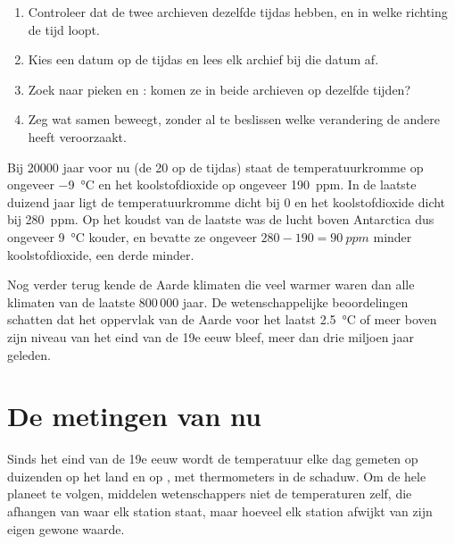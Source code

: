 \begin{method}
\begin{enumerate}
  \item Controleer dat de twee archieven dezelfde tijdas hebben, en in
        welke richting de tijd loopt.
  \item Kies een datum op de tijdas en lees elk archief bij die datum af.
  \item Zoek naar pieken en : komen ze in beide archieven op dezelfde
        tijden?
  \item Zeg wat samen beweegt, zonder al te beslissen welke verandering de
        andere heeft veroorzaakt.
\end{enumerate}
\end{method}

\begin{example}
Bij \num{20000} jaar voor nu (de 20 op de tijdas) staat de
temperatuurkromme op ongeveer \qty{-9}{\degreeCelsius} en het
koolstofdioxide op ongeveer \qty{190}{ppm}. In de laatste duizend jaar
ligt de temperatuurkromme dicht bij 0 en het koolstofdioxide dicht bij
\qty{280}{ppm}. Op het koudst van de laatste  was de lucht boven
Antarctica dus ongeveer \qty{9}{\degreeCelsius} kouder, en bevatte ze
ongeveer $280 - 190 = \qty{90}{ppm}$ minder koolstofdioxide, een derde
minder.
\end{example}

Nog verder terug kende de Aarde klimaten die veel warmer waren dan alle
klimaten van de laatste 800\,000 jaar. De wetenschappelijke
beoordelingen schatten dat het oppervlak van de Aarde voor het laatst
\qty{2.5}{\degreeCelsius} of meer boven zijn niveau van het eind van de
19e eeuw bleef, meer dan drie miljoen jaar geleden.

\section{De metingen van nu}

Sinds het eind van de 19e eeuw wordt de temperatuur elke dag gemeten op
duizenden  op het land en op , met thermometers in de
schaduw. Om de hele planeet te volgen, middelen wetenschappers niet de
temperaturen zelf, die afhangen van waar elk station staat, maar hoeveel
elk station afwijkt van zijn eigen gewone waarde.

